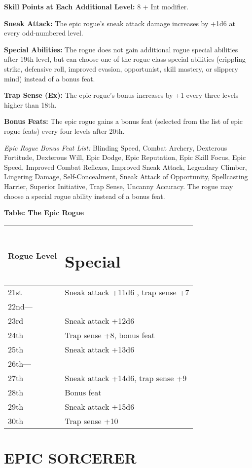 \documentclass{article}
\begin{document}
\textbf{Skill Points at Each Additional Level:} 8 + Int modifier.

\textbf{Sneak Attack:} The epic rogue's sneak attack damage increases by +1d6 at 
every odd-numbered level. 

\textbf{Special Abilities: }The rogue does not gain additional rogue special abilities 
after 19th level, but can choose one of the rogue class special abilities\textit{ 
}(crippling strike, defensive roll, improved evasion, opportunist, skill mastery, 
or slippery mind) instead of a bonus feat. 

\textbf{Trap Sense (Ex):} The epic rogue's bonus increases by +1 every three levels 
higher than 18th.

\textbf{Bonus Feats:} The epic rogue gains a bonus feat (selected from the list 
of epic rogue feats) every four levels after 20th. 

\textit{Epic Rogue Bonus Feat List: }Blinding Speed, Combat Archery, Dexterous 
Fortitude, Dexterous Will, Epic Dodge, Epic Reputation, Epic Skill Focus, Epic 
Speed, Improved Combat Reflexes, Improved Sneak Attack, Legendary Climber, Lingering 
Damage, Self-Concealment, Sneak Attack of Opportunity, Spellcasting Harrier, Superior 
Initiative, Trap Sense, Uncanny Accuracy. The rogue may choose a special rogue 
ability\textit{ }instead of a bonus feat. 

\textbf{Table: The Epic Rogue }

\begin{tabular}{|>{\raggedright}p{31pt}|>{\raggedright}p{143pt}|}
\hline
R\textbf{ogue Level} & \section*{S\textbf{pecial }}\tabularnewline
\hline
21st & Sneak attack +11d6 , trap sense +7\tabularnewline
\hline
22nd--- &  \tabularnewline
\hline
23rd & Sneak attack +12d6 \tabularnewline
\hline
24th & Trap sense +8, bonus feat \tabularnewline
\hline
25th & Sneak attack +13d6 \tabularnewline
\hline
26th--- & \tabularnewline
\hline
27th & Sneak attack +14d6, trap sense +9\tabularnewline
\hline
28th & Bonus feat \tabularnewline
\hline
29th & Sneak attack +15d6\tabularnewline
\hline
30th & Trap sense +10\tabularnewline
\hline
\end{tabular}

\vspace{24pt}
\section*{{\LARGE{}EPIC SORCERER}}
\end{document}
